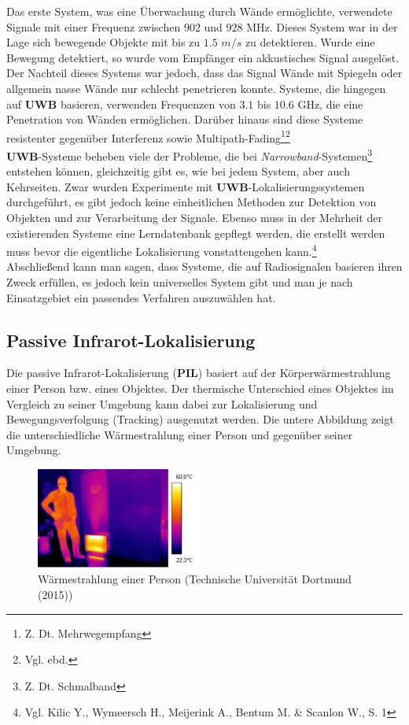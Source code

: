 Das erste System, was eine Überwachung durch Wände ermöglichte, verwendete Signale mit einer Frequenz zwischen $902$ und $928$ MHz. Dieses System war in der Lage sich bewegende Objekte mit bis zu $1.5$ $m/s$ zu detektieren. Wurde eine Bewegung detektiert, so wurde vom Empfänger ein akkustisches Signal ausgelöst. Der Nachteil dieses Systems war jedoch, dass das Signal Wände mit Spiegeln oder allgemein nasse Wände nur schlecht penetrieren konnte. Systeme, die hingegen auf \textbf{UWB} basieren, verwenden Frequenzen von $3.1$ bis $10.6$ GHz, die eine Penetration von Wänden ermöglichen. Darüber hinaus sind diese Systeme resistenter gegenüber Interferenz sowie Multipath-Fading\footnote{Z. Dt. Mehrwegempfang}\footnote{Vgl. ebd.} \\
\textbf{UWB}-Systeme beheben viele der Probleme, die bei \textit{Narrowband}-Systemen\footnote{Z. Dt. Schmalband} entstehen können, gleichzeitig gibt es, wie bei jedem System, aber auch Kehrseiten. Zwar wurden Experimente mit \textbf{UWB}-Lokalisierungssystemen durchgeführt, es gibt jedoch keine einheitlichen Methoden zur Detektion von Objekten und zur Verarbeitung der Signale. Ebenso muss in der Mehrheit der existierenden Systeme eine Lerndatenbank gepflegt werden, die erstellt werden muss bevor die eigentliche Lokalisierung vonstattengehen kann.\footnote{Vgl. Kilic Y., Wymeersch H., Meijerink A., Bentum M. \& Scanlon W., S. 1}\\
Abschließend kann man sagen, dass Systeme, die auf Radiosignalen basieren ihren Zweck erfüllen, es jedoch kein universelles System gibt und man je nach Einsatzgebiet ein passendes Verfahren auszuwählen hat.


\subsection{Passive Infrarot-Lokalisierung}
Die passive Infrarot-Lokalisierung (\textbf{PIL}) basiert auf der Körperwärmestrahlung einer Person bzw. eines Objektes. Der thermische Unterschied eines Objektes im Vergleich zu seiner Umgebung kann dabei zur Lokalisierung und Bewegungsverfolgung (Tracking) ausgenutzt werden. Die untere Abbildung zeigt die unterschiedliche Wärmestrahlung einer Person und gegenüber seiner Umgebung.

\begin{figure}[H]
	\centering
	\includegraphics[width=0.5\textwidth]{pictures/pil1}
	\caption{Wärmestrahlung einer Person (Technische Universität Dortmund (2015))}
\end{figure}

